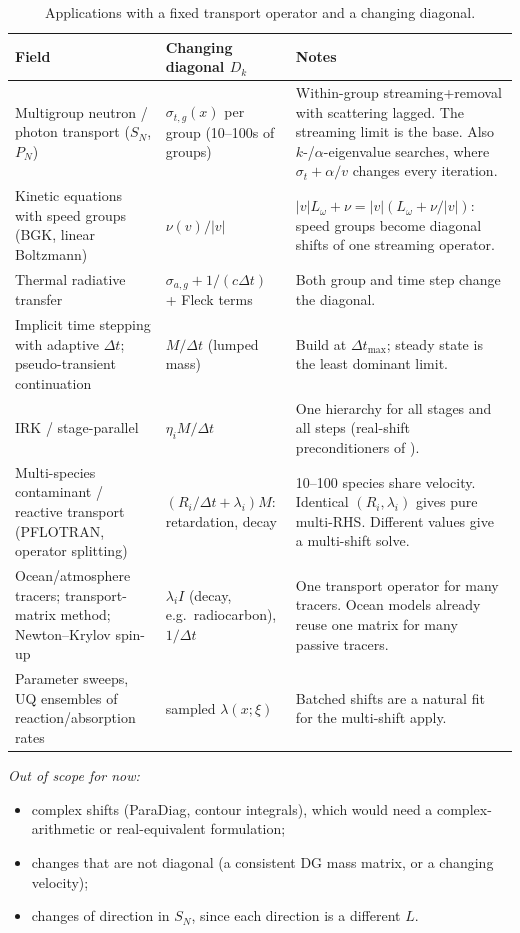 \documentclass[11pt,a4paper]{article}
\begin{document}
\begin{table}[h]\centering\small
\begin{tabularx}{\textwidth}{>{\raggedright}p{3.6cm}>{\raggedright}p{3.6cm}X}
\toprule
Field & Changing diagonal $D_k$ & Notes\\\midrule
Multigroup neutron / photon transport ($S_N$, $P_N$) \cite{AdamsLarsen02,WWM04,Hanophy20,Darg24} & $\sigma_{t,g}(x)$ per group (10--100s of groups) & Within-group streaming+removal with scattering lagged. The streaming limit is the base. Also $k$-/$\alpha$-eigenvalue searches, where $\sigma_t+\alpha/v$ changes every iteration.\\
Kinetic equations with speed groups (BGK, linear Boltzmann) & $\nu(v)/|v|$ & $|v|L_\omega+\nu = |v|(L_\omega+\nu/|v|)$: speed groups become diagonal shifts of one streaming operator.\\
Thermal radiative transfer \cite{LKM13,TWM18,SOPB24} & $\sigma_{a,g}+1/(c\Delta t)$ + Fleck terms & Both group and time step change the diagonal.\\
Implicit time stepping with adaptive $\Delta t$; pseudo-transient continuation & $M/\Delta t$ (lumped mass) & Build at $\Delta t_{\max}$; steady state is the least dominant limit.\\
IRK / stage-parallel \cite{SKPD22,PP17} & $\eta_iM/\Delta t$ & One hierarchy for all stages and all steps (real-shift preconditioners of \cite{SKPD22}).\\
Multi-species contaminant / reactive transport (PFLOTRAN, operator splitting) \cite{Steefel15,HLM14} & $(R_i/\Delta t+\lambda_i)M$: retardation, decay & 10--100 species share velocity. Identical $(R_i,\lambda_i)$ gives pure multi-RHS. Different values give a multi-shift solve.\\
Ocean/atmosphere tracers; transport-matrix method; Newton--Krylov spin-up \cite{KVC05,LiPrimeau08,BPL14} & $\lambda_i I$ (decay, e.g.\ radiocarbon), $1/\Delta t$ & One transport operator for many tracers. Ocean models already reuse one matrix for many passive tracers.\\
Parameter sweeps, UQ ensembles of reaction/absorption rates & sampled $\lambda(x;\xi)$ & Batched shifts are a natural fit for the multi-shift apply.\\
\bottomrule
\end{tabularx}
\caption{Applications with a fixed transport operator and a changing diagonal.}\label{tab:fields}
\end{table}

\noindent\emph{Out of scope for now:}
\begin{itemize}
\item complex shifts (ParaDiag, contour integrals), which would need a complex-arithmetic or real-equivalent formulation;
\item changes that are not diagonal (a consistent DG mass matrix, or a changing velocity);
\item changes of direction in $S_N$, since each direction is a different $L$.
\end{itemize}
\end{document}
